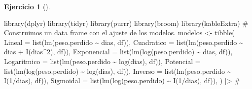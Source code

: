 \documentclass[
  a4paper,
]{scrreport}
\newenvironment{Shaded}{\begin{snugshade}}{\end{snugshade}}
\newcommand{\AttributeTok}[1]{\textcolor[rgb]{0.40,0.45,0.13}{#1}}
\newcommand{\CommentTok}[1]{\textcolor[rgb]{0.37,0.37,0.37}{#1}}
\newcommand{\DecValTok}[1]{\textcolor[rgb]{0.68,0.00,0.00}{#1}}
\newcommand{\FunctionTok}[1]{\textcolor[rgb]{0.28,0.35,0.67}{#1}}
\newcommand{\NormalTok}[1]{\textcolor[rgb]{0.00,0.23,0.31}{#1}}
\newcommand{\OtherTok}[1]{\textcolor[rgb]{0.00,0.23,0.31}{#1}}
\newcommand{\SpecialCharTok}[1]{\textcolor[rgb]{0.37,0.37,0.37}{#1}}
\theoremstyle{definition}
\newtheorem{exercise}{Ejercicio}[chapter]
\theoremstyle{remark}
\begin{document}
\begin{exercise}[]
\begin{enumerate}
  \begin{tcolorbox}[enhanced jigsaw, toprule=.15mm, rightrule=.15mm, arc=.35mm, colback=white, colbacktitle=quarto-callout-tip-color!10!white, toptitle=1mm, left=2mm, colframe=quarto-callout-tip-color-frame, opacityback=0, breakable, opacitybacktitle=0.6, bottomtitle=1mm, titlerule=0mm, title=\textcolor{quarto-callout-tip-color}{\faLightbulb}\hspace{0.5em}{Solución}, bottomrule=.15mm, coltitle=black, leftrule=.75mm]

\begin{Shaded}
\begin{Highlighting}[]
\FunctionTok{library}\NormalTok{(dplyr)}
\FunctionTok{library}\NormalTok{(tidyr)}
\FunctionTok{library}\NormalTok{(purrr)}
\FunctionTok{library}\NormalTok{(broom)}
\FunctionTok{library}\NormalTok{(kableExtra)}
\CommentTok{\# Construimos un data frame con el ajuste de los modelos.}
\NormalTok{modelos }\OtherTok{\textless{}{-}} \FunctionTok{tibble}\NormalTok{(}
        \AttributeTok{Lineal =} \FunctionTok{list}\NormalTok{(}\FunctionTok{lm}\NormalTok{(peso.perdido }\SpecialCharTok{\textasciitilde{}}\NormalTok{ dias, df)),}
        \AttributeTok{Cuadratico =} \FunctionTok{list}\NormalTok{(}\FunctionTok{lm}\NormalTok{(peso.perdido }\SpecialCharTok{\textasciitilde{}}\NormalTok{ dias }\SpecialCharTok{+} \FunctionTok{I}\NormalTok{(dias}\SpecialCharTok{\^{}}\DecValTok{2}\NormalTok{), df)),}
        \AttributeTok{Exponencial =} \FunctionTok{list}\NormalTok{(}\FunctionTok{lm}\NormalTok{(}\FunctionTok{log}\NormalTok{(peso.perdido) }\SpecialCharTok{\textasciitilde{}}\NormalTok{ dias, df)),}
        \AttributeTok{Logaritmico =} \FunctionTok{list}\NormalTok{(}\FunctionTok{lm}\NormalTok{(peso.perdido }\SpecialCharTok{\textasciitilde{}} \FunctionTok{log}\NormalTok{(dias), df)),}
        \AttributeTok{Potencial =} \FunctionTok{list}\NormalTok{(}\FunctionTok{lm}\NormalTok{(}\FunctionTok{log}\NormalTok{(peso.perdido) }\SpecialCharTok{\textasciitilde{}} \FunctionTok{log}\NormalTok{(dias), df)),}
        \AttributeTok{Inverso =} \FunctionTok{list}\NormalTok{(}\FunctionTok{lm}\NormalTok{(peso.perdido }\SpecialCharTok{\textasciitilde{}} \FunctionTok{I}\NormalTok{(}\DecValTok{1}\SpecialCharTok{/}\NormalTok{dias), df)),}
        \AttributeTok{Sigmoidal =} \FunctionTok{list}\NormalTok{(}\FunctionTok{lm}\NormalTok{(}\FunctionTok{log}\NormalTok{(peso.perdido) }\SpecialCharTok{\textasciitilde{}} \FunctionTok{I}\NormalTok{(}\DecValTok{1}\SpecialCharTok{/}\NormalTok{dias), df)),}
\NormalTok{    )  }\SpecialCharTok{|\textgreater{}} 
    \CommentTok{\# }

\end{Highlighting}
\end{Shaded}
\end{tcolorbox}
\end{enumerate}
\end{exercise}
\end{document}
